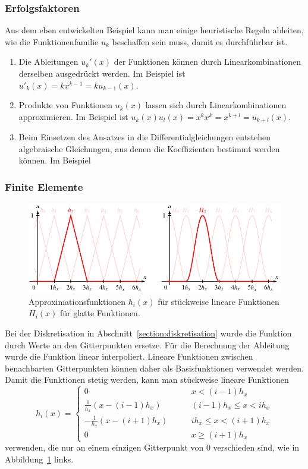 \subsubsection{Erfolgsfaktoren}
Aus dem eben entwickelten Beispiel kann man einige heuristische Regeln ableiten,
wie die Funktionenfamilie $u_k$ beschaffen sein muss, damit es
durchführbar ist.
\begin{enumerate}
\item Die Ableitungen $u_k'(x)$ der Funktionen können durch
Linearkombinationen derselben ausgedrückt werden.
Im Beispiel ist $u'_k(x)=kx^{k-1}=ku_{k-1}(x)$.
\item Produkte von Funktionen $u_k(x)$ lassen sich durch Linearkombinationen
approximieren.
Im Beispiel ist $u_k(x)u_l(x)=x^kx^k = x^{k+l}=u_{k+l}(x)$.
\item Beim Einsetzen des Ansatzes in die Differentialgleichungen
entstehen algebraische Gleichungen, aus denen die Koeffizienten
bestimmt werden können.
Im Beispiel 
\end{enumerate}

\subsubsection{Finite Elemente}
\begin{figure}
\centering
\includegraphics[width=\hsize]{chapters/2/fe.pdf}
\caption{Approximationsfunktionen $h_i(x)$ für stückweise lineare Funktionen 
$H_i(x)$ für glatte Funktionen.
\label{skript:finiteelemente}}
\end{figure}
Bei der Diskretisation in Abschnitt~\ref{section:diskretisation} wurde die
Funktion durch Werte an den Gitterpunkten ersetze.
Für die Berechnung der Ableitung wurde die Funktion linear interpoliert.
Lineare Funktionen zwischen benachbarten Gitterpunkten können daher als
Basisfunktionen verwendet werden.
Damit die Funktionen stetig werden, kann man stückweise lineare
Funktionen
\[
h_i(x) =
\begin{cases}
0&\qquad x< (i-1)h_x\\
\frac{1}{h_x}(x-(i-1)h_x)&\qquad (i-1)h_x \le x < ih_x\\
-\frac{1}{h_x}(x-(i+1)h_x)&\qquad ih_x \le x < (i+1)h_x\\
0&\qquad x \ge (i+1)h_x
\end{cases}
\]
verwenden, die nur an einem einzigen Gitterpunkt von $0$
verschieden sind, wie in Abbildung~\ref{skript:finiteelemente} links.

